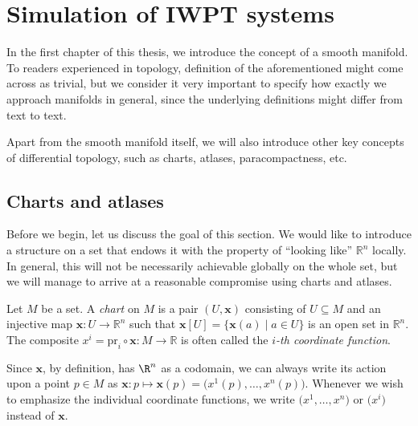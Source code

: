 \documentclass[11pt,a4paper,twoside,openany]{report}
\begin{document}
    \chapter{Simulation of IWPT systems}
    \label{chap:simulation-of-iwpt-systems}

    In the first chapter of this thesis, we introduce the concept of a smooth manifold. To readers experienced in topology, definition of the aforementioned might come across as trivial, but we consider it very important to specify how exactly we approach manifolds in general, since the underlying definitions might differ from text to text.

    Apart from the smooth manifold itself, we will also introduce other key concepts of differential topology, such as charts, atlases, paracompactness, etc.

    \section{Charts and atlases}

        Before we begin, let us discuss the goal of this section. We would like to introduce a structure on a set that endows it with the property of ``looking like'' $\mathbb R^n$ locally. In general, this will not be necessarily achievable globally on the whole set, but we will manage to arrive at a reasonable compromise using charts and atlases.

        \begin{definition}
            Let $M$ be a set. A \emph{chart} on $M$ is a pair $(U,\mathbf x)$ consisting of $U \subseteq M$ and an injective map $\mathbf x:U \to \mathbb R^n$ such that $\mathbf x[U] = \{\mathbf x(a) \mid a \in U\}$ is an open set in $\mathbb R^n$. The composite $x^i = \mathrm{pr}_i \circ \mathbf x: M \to \mathbb R$ is often called the \emph{$i$-th coordinate function}.
        \end{definition}
        
        \begin{note}
            Since $\mathbf x$, by definition, has $\R^n$ as a codomain, we can always write its action upon a point $p \in M$ as $\mathbf x: p \mapsto \mathbf x(p) = \big( x^1(p),\dots,x^n(p) \big)$. Whenever we wish to emphasize the individual coordinate functions, we write $\big( x^1,\dots,x^n \big)$ or $\big( x^i \big)$ instead of $\mathbf x$.
        \end{note}
        
\end{document}
